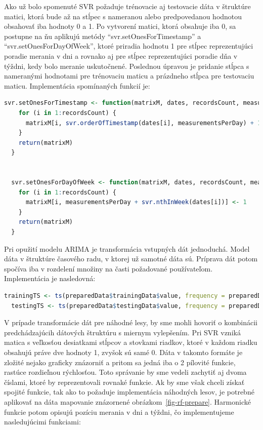 \documentclass[a4paper,slovak,12pt,appendix]{article}
\begin{document}
Ako už bolo spomenuté SVR požaduje trénovacie aj testovacie dáta v štruktúre
matici, ktorá bude až na stĺpec s nameranou alebo predpovedanou hodnotou
obsahovať iba hodnoty 0 a 1. Po vytvorení matici, ktorá obsahuje iba 0, sa
postupne na ňu aplikujú metódy ``svr.setOnesForTimestamp'' a ``svr.setOnesForDayOfWeek'',
ktoré priradia hodnotu 1 pre stĺpec reprezentujúci poradie merania v dni a
rovnako aj pre stĺpec reprezentujúci poradie dňa v týždni, kedy bolo meranie
uskutočnené. Poslednou úpravou je pridanie stĺpca s nameranými hodnotami pre
trénovaciu maticu a prázdneho stĺpca pre testovaciu maticu. Implementácia
spomínaných funkcií je:

\begin{lstlisting}[language=R]
  svr.setOnesForTimestamp <- function(matrixM, dates, recordsCount, measurementsPerDay) {
    for (i in 1:recordsCount) {
      matrixM[i, svr.orderOfTimestamp(dates[i], measurementsPerDay) + 1] <- 1
    }
    return(matrixM)
  }


  svr.setOnesForDayOfWeek <- function(matrixM, dates, recordsCount, measurementsPerDay) {
    for (i in 1:recordsCount) {
      matrixM[i, measurementsPerDay + svr.nthInWeek(dates[i])] <- 1
    }
    return(matrixM)
  }
\end{lstlisting}

Pri opužití modelu ARIMA je transformácia vstupných dát jednoduchá. Model
dáta v štruktúre časového radu, v ktorej už samotné dáta sú. Príprava dát potom
spočíva iba v rozdelení množiny na časti požadované používateľom. Implementácia
je nasledovná:

\begin{lstlisting}[language=R]
  trainingTS <- ts(preparedData$trainingData$value, frequency = preparedData$measurementsPerDay)
  testingTS <- ts(preparedData$testingData$value, frequency = preparedData$measurementsPerDay)
\end{lstlisting}

V prípade transformácie dát pre náhodné lesy, by sme mohli hovoriť o kombinácii
predchádzajúcih dátových štruktúru s miernym vylepšením. Pri SVR vzniká matica
s veľkosťou desiatkami stĺpcov a stovkami riadkov, ktoré v každom riadku
obsahujú práve dve hodnoty 1, zvyšok sú samé 0. Dáta v takomto formáte je
zložité nejako graficky znázorniť a pritom sa jedná iba o 2 pílovité funkcie,
rastúce rozdieľnou rýchlosťou. Toto správanie by sme vedeli zachytiť aj dvoma
číslami, ktoré by reprezentovali rovnaké funkcie. Ak by sme však chceli získať
spojité funkcie, tak ako to požaduje implementácia náhodných lesov, je potrebné
aplikovať na dáta mapovanie znázornené obrázkom~\ref{fig-rf-prepare}. Harmonické
funkcie potom opisujú pozíciu merania v dni a týždni, čo implementujeme
nasledujúcimi funkciami:
\end{document}
